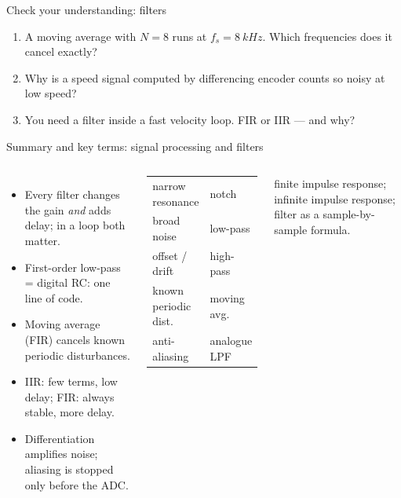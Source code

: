 \documentclass[aspectratio=169,10pt]{beamer}
\begin{document}
\begin{frame}{Check your understanding: filters}
\begin{keybox}
\large
\begin{enumerate}
\item A moving average with $N=8$ runs at $f_s=\SI{8}{kHz}$. Which frequencies does it cancel exactly?
\item Why is a speed signal computed by differencing encoder counts so noisy at low speed?
\item You need a filter inside a fast velocity loop. FIR or IIR --- and why?
\end{enumerate}
\end{keybox}
\end{frame}

\begin{frame}{Summary and key terms: signal processing and filters}
\begin{columns}[T]
\begin{itemize}\small
\item Every filter changes the gain \emph{and} adds delay; in a loop both matter.
\item First-order low-pass = digital RC: one line of code.
\item Moving average (FIR) cancels known periodic disturbances.
\item IIR: few terms, low delay; FIR: always stable, more delay.
\item Differentiation amplifies noise; aliasing is stopped only before the ADC.
\end{itemize}
\begin{keybox}
\small
\begin{tabular}{@{}l l@{}}
narrow resonance & notch\\
broad noise & low-pass\\
offset / drift & high-pass\\
known periodic dist. & moving avg.\\
anti-aliasing & analogue LPF\\
\end{tabular}
\end{keybox}
{\small {} finite impulse response;  infinite impulse response;  filter as a sample-by-sample formula.}
\end{columns}
\end{frame}
\end{document}
